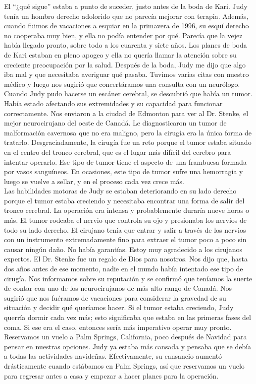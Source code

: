 \documentclass[twoside, 12pt]{book}
\begin{document}
El “¿qué sigue” estaba a punto de suceder, justo antes de la boda de Kari. Judy tenía un hombro derecho adolorido que no parecía mejorar con terapia. Además, cuando fuimos de vacaciones a esquiar en la primavera de 1996, su esquí derecho no cooperaba muy bien, y ella no podía entender por qué. Parecía que la vejez había llegado pronto, sobre todo a los cuarenta y siete años. Los planes de boda de Kari estaban en pleno apogeo y ella no quería llamar la atención sobre su creciente preocupación por la salud. Después de la boda, Judy me dijo que algo iba mal y que necesitaba averiguar qué pasaba. Tuvimos varias citas con nuestro médico y luego nos sugirió que concertáramos una consulta con un neurólogo. Cuando Judy pudo hacerse un escáner cerebral, se descubrió que había un tumor. Había estado afectando sus extremidades y su capacidad para funcionar correctamente. Nos enviaron a la ciudad de Edmonton para ver al Dr. Stenke, el mejor neurocirujano del oeste de Canadá. Le diagnosticaron un tumor de malformación cavernosa que no era maligno, pero la cirugía era la única forma de tratarlo. Desgraciadamente, la cirugía fue un reto porque el tumor estaba situado en el centro del tronco cerebral, que es el lugar más difícil del cerebro para intentar operarlo. Ese tipo de tumor tiene el aspecto de una frambuesa formada por vasos sanguíneos. En ocasiones, este tipo de tumor sufre una hemorragia y luego se vuelve a sellar, y en el proceso cada vez crece más.\\

Las habilidades motoras de Judy se estaban deteriorando en su lado derecho porque el tumor estaba creciendo y necesitaba encontrar una forma de salir del tronco cerebral. La operación era intensa y probablemente duraría nueve horas o más. El tumor rodeaba el nervio que controla su ojo y presionaba los nervios de todo su lado derecho. El cirujano tenía que entrar y salir a través de los nervios con un instrumento extremadamente fino para extraer el tumor poco a poco sin causar ningún daño. No había garantías. Estoy muy agradecido a los cirujanos expertos. El Dr. Stenke fue un regalo de Dios para nosotros. Nos dijo que, hasta dos años antes de ese momento, nadie en el mundo había intentado ese tipo de cirugía. Nos informamos sobre su reputación y se confirmó que teníamos la suerte de contar con uno de los neurocirujanos de más alto rango de Canadá. Nos sugirió que nos fuéramos de vacaciones para considerar la gravedad de su situación y decidir qué queríamos hacer. Si el tumor estaba creciendo, Judy querría dormir cada vez más; esto significaba que estaba en las primeras fases del coma. Si ese era el caso, entonces sería más imperativo operar muy pronto. Reservamos un vuelo a Palm Springs, California, poco después de Navidad para pensar en nuestras opciones. Judy ya estaba más cansada y pensaba que se debía a todas las actividades navideñas. Efectivamente, su cansancio aumentó drásticamente cuando estábamos en Palm Springs, así que reservamos un vuelo para regresar antes a casa y empezar a hacer planes para la operación.\\
\end{document}
